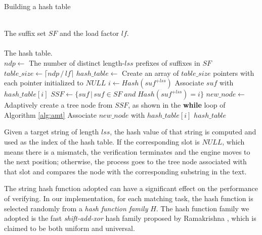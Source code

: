 

\begin{algorithm}
  \caption{Building a hash table}\scriptsize
  \label{alg:hash}
  \begin{algorithmic}[1]
    \REQUIRE ~~\\
    The suffix set $SF$ and the load factor $lf$. \\
    \ENSURE ~~\\
    The hash table.\\
    \STATE
    \STATE $ndp \leftarrow$ The number of distinct length-$lss$
    prefixes of suffixes in $SF$
    \STATE $table\_size \leftarrow \lceil ndp\,/\,lf \rceil$
    \STATE $hash\_table \leftarrow$ Create an array  of
    $table\_size$ pointers with each pointer initialized to $NULL$
    \STATE
    \STATE $i \leftarrow Hash(suf^{+lss})$
    \STATE Associate $suf$ with $hash\_table[i]$
    \ENDFOR
    \STATE
    \STATE $SSF \leftarrow \{suf\,|\,suf\in SF\; and\; Hash(suf^{+lss})=i\}$
    \STATE $new\_node \leftarrow$ Adaptively create a tree node from
    $SSF$, as shown in the \textbf{while} loop of Algorithm \ref{alg:amt}
    \STATE Associate $new\_node$ with $hash\_table[i]$
    \ENDIF
    \ENDFOR
    \STATE
    \RETURN $hash\_table$
  \end{algorithmic}
\end{algorithm}

Given a target string of length $lss$, the hash value of that string
is computed and used as the index of the hash table. If the
corresponding slot is $NULL$, which means there is a mismatch, the
verification terminates and the engine moves to the next position;
otherwise, the process goes to the tree node associated with that slot
and compares the node with the corresponding substring in the text.

The string hash function adopted can have a significant effect on the
performance of verifying. In our implementation, for each matching
task, the hash function is selected randomly from a \emph{hash
  function family} $H$. The hash function family we adopted is the
fast \emph{shift-add-xor} hash family proposed by Ramakrishna
\cite{Ramakrishna1997}, which is claimed to be both uniform and
universal.

